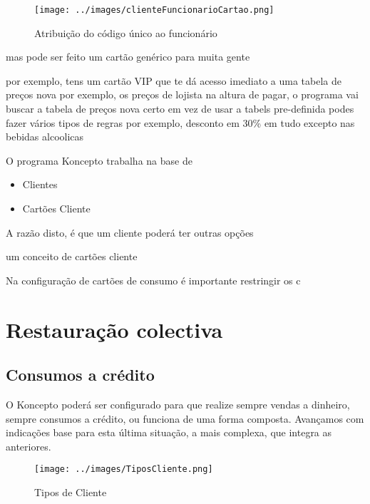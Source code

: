 \documentclass[a4paper,11pt,openany]{memoir}
\begin{document}
\begin{figure}[h]
\begin{center}
\texttt{[image: ../images/clienteFuncionarioCartao.png]}
\caption[Submanifold]{Atribuição do código único ao funcionário}
\label{clienteFuncionarioCartao}
\end{center}
\end{figure}






mas pode ser feito um cartão genérico para muita gente

por exemplo, tens um cartão VIP
que te dá acesso imediato a uma tabela de preços nova
por exemplo, os preços de lojista
na altura de pagar, o programa vai buscar a tabela de preços nova
certo
em vez de usar a tabels pre-definida
podes fazer vários tipos de regras
por exemplo, desconto em 30\% em tudo excepto nas bebidas alcoolicas




O programa Koncepto trabalha na base de
\begin{itemize}
\item Clientes
\item Cartões Cliente
\end{itemize}

A razão disto, é que um cliente poderá ter outras opções 

um conceito de cartões cliente 


Na configuração de cartões de consumo  é importante restringir os c 




\chapter{Restauração colectiva}
\label{ch:restauracaocolectiva}

\section{Consumos a crédito}

O Koncepto poderá ser configurado para que realize sempre vendas a dinheiro,
sempre consumos a crédito, ou funciona de uma forma composta. Avançamos com
indicações base para esta última situação, a mais complexa, que integra as
anteriores.

\begin{figure}[h]
\begin{center}
\texttt{[image: ../images/TiposCliente.png]}
\caption[Submanifold]{Tipos de Cliente}
\label{TiposCliente}
\end{center}
\end{figure}
\end{document}
